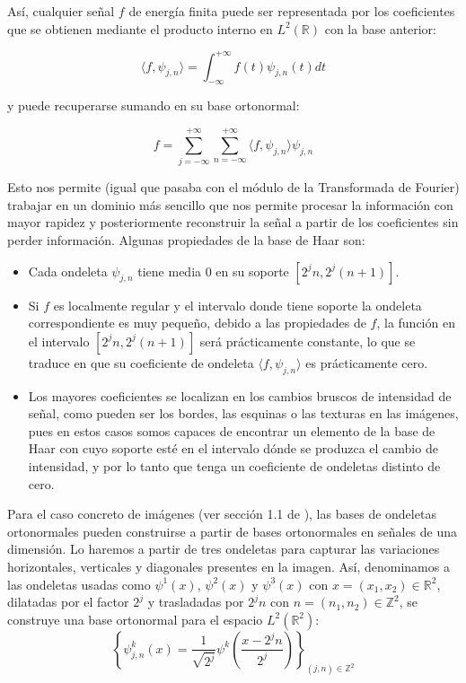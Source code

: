 \noindent Así, cualquier señal $f$ de energía finita puede ser representada por los coeficientes que se obtienen mediante el producto interno en $L^2(\mathbb{R})$ con la base anterior: 

$$\langle f,\psi_{j,n} \rangle =\int_{-\infty}^{+\infty} f(t) \psi_{j,n} (t) dt  $$

\noindent y puede recuperarse sumando en su base ortonormal:

$$f=\sum_{j=-\infty}^{+\infty}\sum_{n=-\infty}^{+\infty}  \langle f,\psi_{j,n} \rangle \psi_{j,n} $$

\noindent Esto nos permite (igual que pasaba con el módulo de la Transformada de Fourier) trabajar en un dominio más sencillo que nos permite procesar la información con mayor rapidez y posteriormente reconstruir la señal a partir de los coeficientes sin perder información. Algunas propiedades de la base de Haar son: 

\newpage

\begin{itemize}
  \item Cada ondeleta $\psi_{j,n}$ tiene media $0$ en su soporte $[2^jn, 2^j(n+1)]$.
  \item Si $f$ es localmente regular y el intervalo donde tiene soporte la ondeleta correspondiente es muy pequeño, debido a las propiedades de $f$, la función en el intervalo  $[2^jn, 2^j(n+1)]$ será prácticamente constante, lo que se traduce en que su coeficiente de ondeleta $\langle f,\psi_{j,n} \rangle$ es prácticamente cero.
  \item Los mayores coeficientes se localizan en los cambios bruscos de intensidad de señal, como pueden ser los bordes, las esquinas o las texturas en las imágenes, pues en estos casos somos capaces de encontrar un elemento de la base de Haar con cuyo soporte esté en el intervalo dónde se produzca el cambio de intensidad, y por lo tanto que tenga un coeficiente de ondeletas distinto de cero.
\end{itemize}

\noindent Para el caso concreto de imágenes (ver sección 1.1 de \cite{MallatWavelets}), las bases de ondeletas ortonormales pueden construirse a partir de bases ortonormales en señales de una dimensión. Lo haremos a partir de tres ondeletas para capturar las variaciones horizontales, verticales y diagonales presentes en la imagen. Así, denominamos a las ondeletas usadas como $\psi^1(x)$, $\psi^2(x)$ y $\psi^3(x)$ con $x=(x_1,x_2)\in \mathbb{R}^2$, dilatadas por el factor $2^j$ y trasladadas por $2^jn$ con $n=(n_1,n_2) \in \mathbb{Z}^2$, se construye una base ortonormal para el espacio $L^2(\mathbb{R}^2)$: 
$$\left \lbrace \psi_{j,n}^k(x)= \frac{1}{\sqrt{2^j}} \psi^k\left(\frac{x-2^jn}{2^j}\right) \right \rbrace_{(j,n) \in \mathbb{Z}^2}$$

